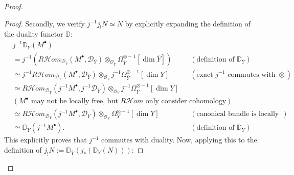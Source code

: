 \begin{remark}
\begin{proof}
\begin{enumerate}
\begin{proof}
                      Secondly, we verify $j^{-1}j_!N \simeq N$ by explicitly expanding the definition of the duality functor $\mathbb{D}$:
                      \begin{align*}
                           & j^{-1} \mathbb{D}_{\overline Y}(M^\bullet)                                                                                                                                                                                                          \\
                           & = j^{-1} \left( R\mathcal{H}om_{\mathcal D_{\overline Y}}(M^\bullet, \mathcal D_{\overline Y}) \otimes_{\mathcal O_{\overline Y}} \Omega_{\overline Y}^{\otimes -1}[\dim \overline Y] \right) &  & (\text{definition of } \mathbb{D}_{\overline Y}) \\
                           & \simeq j^{-1}R\mathcal{H}om_{\mathcal D_{\overline Y}}(M^\bullet, \mathcal D_{\overline Y}) \otimes_{\mathcal O_Y} j^{-1}\Omega_{\overline Y}^{\otimes -1}[\dim Y]                            &  & (\text{exact $j^{-1}$ commutes with } \otimes)   \\
                           & \simeq R\mathcal{H}om_{\mathcal D_Y}(j^{-1}M^\bullet, j^{-1}\mathcal D_{\overline Y}) \otimes_{\mathcal O_Y} j^{-1}\Omega_{\overline Y}^{\otimes -1}[\dim Y]                                                                                        \\
                           & (\text{$M^{\bullet}$ may not be locally free, but $R\mathcal{H}om$ only consider cohomology})                                                                                                                                                       \\
                           & \simeq R\mathcal{H}om_{\mathcal D_Y}(j^{-1}M^\bullet, \mathcal D_Y) \otimes_{\mathcal O_Y} \Omega_Y^{\otimes -1}[\dim Y]                                                                      &  & (\text{canonical bundle is locally free})        \\
                           & \simeq \mathbb{D}_Y(j^{-1}M^\bullet).                                                                                                                                                         &  & (\text{definition of } \mathbb{D}_Y)
                      \end{align*}
                      This explicitly proves that $j^{-1}$ commutes with duality. Now, applying this to the definition of $j_! N := \mathbb{D}_{\overline Y}(j_*(\mathbb{D}_Y(N)))$:

\end{proof}
\end{enumerate}
\end{proof}
\end{remark}
